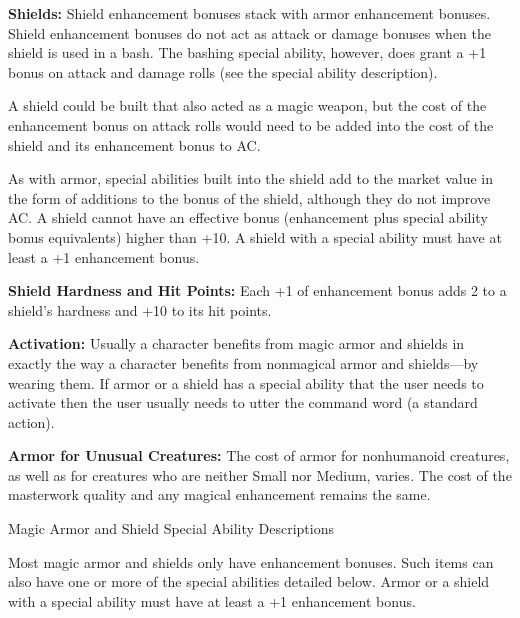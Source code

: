 \textbf{Shields:} Shield enhancement bonuses stack with armor enhancement bonuses. 
Shield enhancement bonuses do not act as attack or damage bonuses when the shield 
is used in a bash. The bashing special ability, however, does grant a +1 bonus 
on attack and damage rolls (see the special ability description).

A shield could be built that also acted as a magic weapon, but the cost of the 
enhancement bonus on attack rolls would need to be added into the cost of the shield 
and its enhancement bonus to AC.

As with armor, special abilities built into the shield add to the market value 
in the form of additions to the bonus of the shield, although they do not improve 
AC. A shield cannot have an effective bonus (enhancement plus special ability bonus 
equivalents) higher than +10. A shield with a special ability must have at least 
a +1 enhancement bonus.

\textbf{Shield Hardness and Hit Points:} Each +1 of enhancement bonus adds 2 to 
a shield's hardness and +10 to its hit points.

\textbf{Activation:} Usually a character benefits from magic armor and shields 
in exactly the way a character benefits from nonmagical armor and shields---by 
wearing them. If armor or a shield has a special ability that the user needs to 
activate then the user usually needs to utter the command word (a standard action).

\textbf{Armor for Unusual Creatures: }The cost of armor for nonhumanoid creatures, 
as well as for creatures who are neither Small nor Medium, varies\textit{. }The 
cost of the masterwork quality and any magical enhancement remains the same.

\vspace{12pt}
Magic Armor and Shield Special Ability Descriptions

Most magic armor and shields only have enhancement bonuses. Such items can also 
have one or more of the special abilities detailed below. Armor or a shield with 
a special ability must have at least a +1 enhancement bonus.

